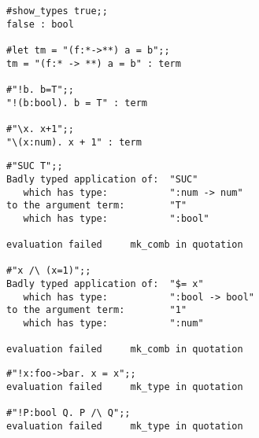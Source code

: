 
\vskip4mm
\begin{session}\begin{verbatim}
#show_types true;;
false : bool

#let tm = "(f:*->**) a = b";;
tm = "(f:* -> **) a = b" : term

#"!b. b=T";;
"!(b:bool). b = T" : term

#"\x. x+1";;
"\(x:num). x + 1" : term
\end{verbatim}\end{session}



\vskip4mm
\begin{session}\begin{verbatim}
#"SUC T";;
Badly typed application of:  "SUC"
   which has type:           ":num -> num"
to the argument term:        "T"
   which has type:           ":bool"

evaluation failed     mk_comb in quotation

#"x /\ (x=1)";;
Badly typed application of:  "$= x"
   which has type:           ":bool -> bool"
to the argument term:        "1"
   which has type:           ":num"

evaluation failed     mk_comb in quotation
\end{verbatim}\end{session}

\vskip4mm
\begin{session}\begin{verbatim}
#"!x:foo->bar. x = x";;
evaluation failed     mk_type in quotation

#"!P:bool Q. P /\ Q";;
evaluation failed     mk_type in quotation
\end{verbatim}\end{session}

%
%
%
%
%

